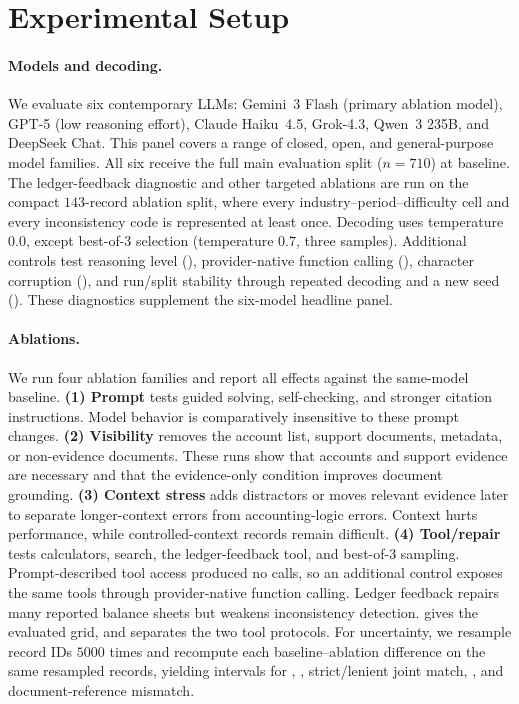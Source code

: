 \section{Experimental Setup}
\label{sec:setup}

\paragraph{Models and decoding.}
We evaluate six contemporary LLMs: Gemini~3 Flash (primary ablation model), GPT-5 (low reasoning effort), Claude Haiku~4.5, Grok-4.3, Qwen~3 235B, and DeepSeek Chat. This panel covers a range of closed, open, and general-purpose model families. All six receive the full main evaluation split ($n{=}710$) at baseline. The ledger-feedback diagnostic and other targeted ablations are run on the compact $143$-record ablation split, where every industry--period--difficulty cell and every inconsistency code is represented at least once. Decoding uses temperature $0.0$, except best-of-3 selection (temperature $0.7$, three samples). Additional controls test reasoning level (), provider-native function calling (), character corruption (), and run/split stability through repeated decoding and a new seed (). These diagnostics supplement the six-model headline panel.

\paragraph{Ablations.}
We run four ablation families and report all effects against the same-model baseline. \textbf{(1) Prompt} tests guided solving, self-checking, and stronger citation instructions. Model behavior is comparatively insensitive to these prompt changes. \textbf{(2) Visibility} removes the account list, support documents, metadata, or non-evidence documents. These runs show that accounts and support evidence are necessary and that the evidence-only condition improves document grounding. \textbf{(3) Context stress} adds distractors or moves relevant evidence later to separate longer-context errors from accounting-logic errors. Context hurts performance, while controlled-context records remain difficult. \textbf{(4) Tool/repair} tests calculators, search, the ledger-feedback tool, and best-of-3 sampling. Prompt-described tool access produced no calls, so an additional control exposes the same tools through provider-native function calling. Ledger feedback repairs many reported balance sheets but weakens inconsistency detection.  gives the evaluated grid, and  separates the two tool protocols. For uncertainty, we resample record IDs $5000$ times and recompute each baseline--ablation difference on the same resampled records, yielding intervals for \bsexact{}, \bsrecon{}, strict/lenient joint match, \incCode{}, and document-reference mismatch.

